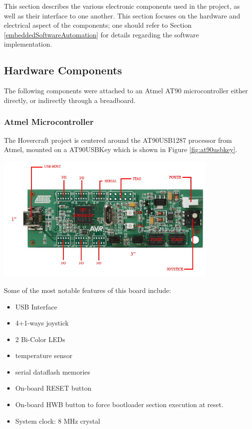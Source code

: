 This section describes the various electronic components used in the project, as
well as their interface to one another.  This section focuses on the hardware
and electrical aspect of the components; one should refer to Section
\ref{embeddedSoftwareAutomation} for details regarding the software
implementation.  

\subsection{Hardware Components}
The following components were attached to an Atmel AT90 microcontroller either directly, or indirectly through a breadboard.  

\subsubsection{Atmel Microcontroller}
The Hovercraft project is centered around the AT90USB1287 processor from Atmel, mounted on a AT90USBKey which is shown in Figure \ref{fig:at90usbkey}.


  \begin{center}
    \includegraphics[width=110mm]{imageSources/at90usbkey.png}
  \end{center}
  \label{fig:at90usbkey}


Some of the most notable features of this board include:
\begin{itemize}
\item USB Interface
\item 4+1-ways joystick
\item 2 Bi-Color LEDs
\item temperature sensor
\item serial dataflash memories
\item On-board RESET button 
\item On-board HWB button to force bootloader section execution at reset.
\item System clock: 8 MHz crystal
\end{itemize}


